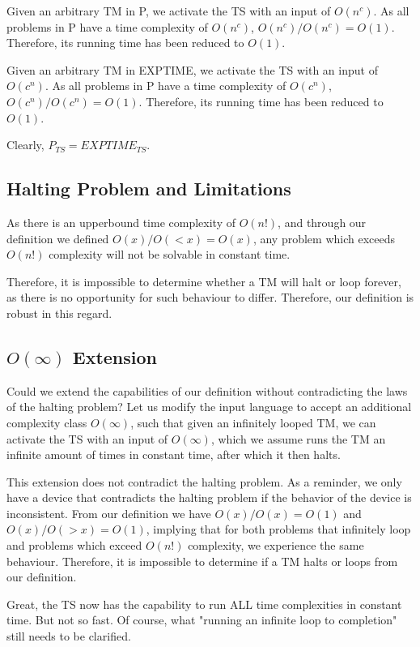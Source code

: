 \documentclass{report}
\begin{document}
Given an arbitrary TM in P, we activate the TS with an input of $O(n^c)$. As all problems in P have a time complexity of $O(n^c)$, $O(n^c)/O(n^c) = O(1)$. Therefore, its running time has been reduced to $O(1)$.

Given an arbitrary TM in EXPTIME, we activate the TS with an input of $O(c^n)$. As all problems in P have a time complexity of $O(c^n)$, $O(c^n)/O(c^n) = O(1)$. Therefore, its running time has been reduced to $O(1)$.

Clearly, $P_{TS} = EXPTIME_{TS}$.

\subsection{Halting Problem and Limitations}

As there is an upperbound time complexity of $O(n!)$, and through our definition we defined $O(x)/O(<x) = O(x)$, any problem which exceeds $O(n!)$ complexity will not be solvable in constant time.

Therefore, it is impossible to determine whether a TM will halt or loop forever, as there is no opportunity for such behaviour to differ. Therefore, our definition is robust in this regard.

\subsection{$O(\infty)$ Extension}

Could we extend the capabilities of our definition without contradicting the laws of the halting problem? Let us modify the input language to accept an additional complexity class $O(\infty)$, such that given an infinitely looped TM, we can activate the TS with an input of $O(\infty)$, which we assume runs the TM an infinite amount of times in constant time, after which it then halts.

This extension does not contradict the halting problem. As a reminder, we only have a device that contradicts the halting problem if the behavior of the device is inconsistent. From our definition we have $O(x)/O(x) = O(1)$ and $O(x)/O(>x) = O(1)$, implying that for both problems that infinitely loop and problems which exceed $O(n!)$ complexity, we experience the same behaviour. Therefore, it is impossible to determine if a TM halts or loops from our definition.

Great, the TS now has the capability to run ALL time complexities in constant time. But not so fast. Of course, what "running an infinite loop to completion" still needs to be clarified.
\end{document}
